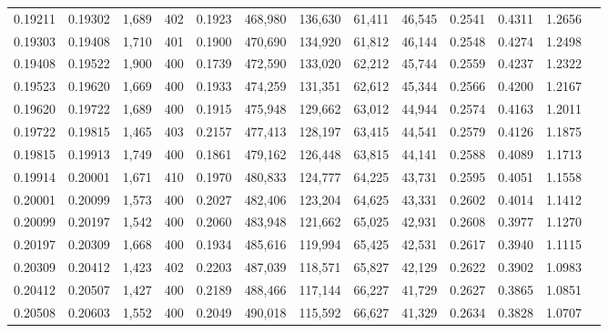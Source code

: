 \begin{tabular}{rrrrrrrrrrrrr}
0.19211 & 0.19302 &  1,689 & 402 &                                     0.1923 & 468,980 & 136,630 &  61,411 &  46,545 & 0.2541 & 0.4311 & 1.2656 \\
0.19303 & 0.19408 &  1,710 & 401 &                                     0.1900 & 470,690 & 134,920 &  61,812 &  46,144 & 0.2548 & 0.4274 & 1.2498 \\
0.19408 & 0.19522 &  1,900 & 400 &                                     0.1739 & 472,590 & 133,020 &  62,212 &  45,744 & 0.2559 & 0.4237 & 1.2322 \\
0.19523 & 0.19620 &  1,669 & 400 &                                     0.1933 & 474,259 & 131,351 &  62,612 &  45,344 & 0.2566 & 0.4200 & 1.2167 \\
0.19620 & 0.19722 &  1,689 & 400 &                                     0.1915 & 475,948 & 129,662 &  63,012 &  44,944 & 0.2574 & 0.4163 & 1.2011 \\
0.19722 & 0.19815 &  1,465 & 403 &                                     0.2157 & 477,413 & 128,197 &  63,415 &  44,541 & 0.2579 & 0.4126 & 1.1875 \\
0.19815 & 0.19913 &  1,749 & 400 &                                     0.1861 & 479,162 & 126,448 &  63,815 &  44,141 & 0.2588 & 0.4089 & 1.1713 \\
0.19914 & 0.20001 &  1,671 & 410 &                                     0.1970 & 480,833 & 124,777 &  64,225 &  43,731 & 0.2595 & 0.4051 & 1.1558 \\
0.20001 & 0.20099 &  1,573 & 400 &                                     0.2027 & 482,406 & 123,204 &  64,625 &  43,331 & 0.2602 & 0.4014 & 1.1412 \\
0.20099 & 0.20197 &  1,542 & 400 &                                     0.2060 & 483,948 & 121,662 &  65,025 &  42,931 & 0.2608 & 0.3977 & 1.1270 \\
0.20197 & 0.20309 &  1,668 & 400 &                                     0.1934 & 485,616 & 119,994 &  65,425 &  42,531 & 0.2617 & 0.3940 & 1.1115 \\
0.20309 & 0.20412 &  1,423 & 402 &                                     0.2203 & 487,039 & 118,571 &  65,827 &  42,129 & 0.2622 & 0.3902 & 1.0983 \\
0.20412 & 0.20507 &  1,427 & 400 &                                     0.2189 & 488,466 & 117,144 &  66,227 &  41,729 & 0.2627 & 0.3865 & 1.0851 \\
0.20508 & 0.20603 &  1,552 & 400 &                                     0.2049 & 490,018 & 115,592 &  66,627 &  41,329 & 0.2634 & 0.3828 & 1.0707 \\

\end{tabular}

